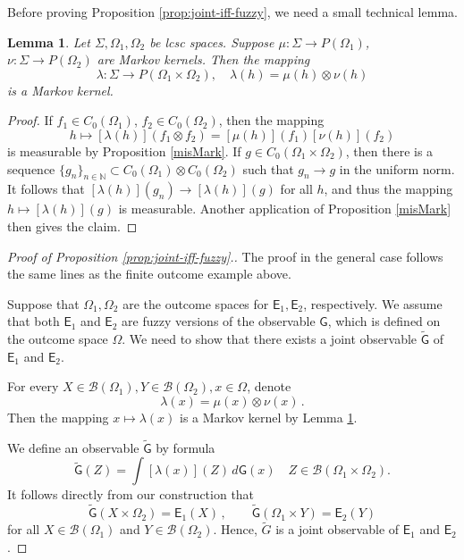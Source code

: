 \documentclass[12pt]{amsart}
\newtheorem{lemma}{Lemma}
\theoremstyle{definition}
\newcommand{\N}{\mathbb N} %
\newcommand{\Eo}{\mathsf{E}} %
\newcommand{\Go}{\mathsf{G}} %
\newcommand{\bor}[1]{\mathcal{B}(#1)} %
\newcommand{\de}{\, d}
\newcommand{\frecc}{\rightarrow}
\begin{document}
Before proving Proposition \ref{prop:joint-iff-fuzzy}, we need a small technical lemma.

\begin{lemma}\label{lemma:markov}
Let $\Sigma , \Omega_1 , \Omega_2$ be lcsc spaces. Suppose $\mu : \Sigma \frecc P(\Omega_1)$, $\nu : \Sigma \frecc P(\Omega_2)$ are Markov kernels. Then the mapping
\begin{equation*}
\lambda: \Sigma \frecc P(\Omega_1 \times \Omega_2) , \quad \lambda (h) = \mu (h) \otimes \nu (h)
\end{equation*}
is a Markov kernel.
\end{lemma}

\begin{proof}
If $f_1 \in C_0 (\Omega_1)$, $f_2 \in C_0 (\Omega_2)$, then the mapping
\begin{equation*}
h \mapsto [\lambda (h)] (f_1 \otimes f_2) = [\mu (h)] (f_1) [\nu (h)] (f_2)
\end{equation*}
is measurable by Proposition \ref{misMark}. If $g \in C_0 (\Omega_1\times\Omega_2)$, then there is a sequence $\{ g_n \}_{n\in\N} \subset C_0 (\Omega_1) \otimes C_0 (\Omega_2)$ such that $g_n \to g$ in the uniform norm. It follows that $[\lambda (h)] (g_n) \to [\lambda (h)] (g)$ for all $h$, and thus the mapping $h \mapsto [\lambda (h)] (g)$ is measurable. Another application of Proposition \ref{misMark} then gives the claim.
\end{proof}
\begin{proof}[Proof of Proposition \ref{prop:joint-iff-fuzzy}.]
The proof in the general case follows the same lines as the finite outcome example above.

Suppose that $\Omega_1,\Omega_2$ are the outcome spaces for $\Eo_1 , \Eo_2$, respectively. We assume that both $\Eo_1$ and $\Eo_2$ are fuzzy versions of the observable $\Go$, which is defined on the outcome space $\Omega$. We need to show that there exists a joint observable $\widetilde{\Go}$ of $\Eo_1$ and $\Eo_2$.

For every $X\in\bor{\Omega_1},Y\in\bor{\Omega_2},x\in\Omega$, denote
\begin{equation*}
\lambda (x) =  \mu (x) \otimes \nu (x) \, .
\end{equation*}
Then the mapping $x \mapsto \lambda (x)$ is a Markov kernel by Lemma \ref{lemma:markov}.

We define an observable $\widetilde{\Go}$ by formula
\begin{equation*}
\widetilde{\Go}(Z)=\int [\lambda (x)] (Z) \de \Go(x) \quad Z\in\bor{\Omega_1 \times \Omega_2} .
\end{equation*}
It follows directly from our construction that
\begin{equation*}
\widetilde{\Go}(X\times\Omega_2) = \Eo_1(X) \, , \qquad \widetilde{\Go}(\Omega_1\times Y) = \Eo_2(Y)
\end{equation*}
for all $X\in\bor{\Omega_1}$ and $Y\in\bor{\Omega_2}$. Hence, $\widetilde{G}$ is a joint observable of $\Eo_1$ and $\Eo_2$.
\end{proof}
\end{document}
